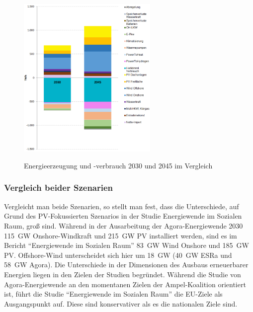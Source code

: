 				\begin{figure}[H]
				\centering
				\includegraphics[page=1, clip, width=0.6\textwidth]{./anhang/Strombilanz Frauenhofer.png}
				\caption{Energieerzeugung und -verbrauch 2030 und 2045 im Vergleich}
				\label{Abb. Energiesystem 2045} \cite[S.9]{ESRa_Fraunhofer}
			\end{figure}
		
		\subsubsection{Vergleich beider Szenarien}
		Vergleicht man beide Szenarien, so stellt man fest, dass die Unterschiede, auf Grund des  PV-Fokussierten Szenarios in der Studie Energiewende im Sozialen Raum, groß sind. Während in der Ausarbeitung der Agora-Energiewende 2030 \SI{115}{\giga \watt} Onshore-Windkraft und \SI{215}{\giga \watt} PV installiert werden, sind es im Bericht "`Energiewende im Sozialen Raum"' \SI{83}{\giga \watt} Wind Onshore und \SI{185}{\giga \watt} PV. Offshore-Wind unterscheidet sich hier um \SI{18}{\giga \watt} (\SI{40}{\giga \watt} ESRa und \SI{58}{\giga \watt} Agora). Die Unterschiede in der Dimensionen des Ausbaus erneuerbarer Energien liegen in den Zielen der Studien begründet. Während die Studie von Agora-Energiewende an den momentanen Zielen der Ampel-Koalition orientiert ist, führt die Studie "`Energiewende im Sozialen Raum"' die EU-Ziele als Ausgangspunkt auf. Diese sind konservativer als es die nationalen Ziele sind.\cite{EU_Klimaziele}
		\clearpage
		
		
		
